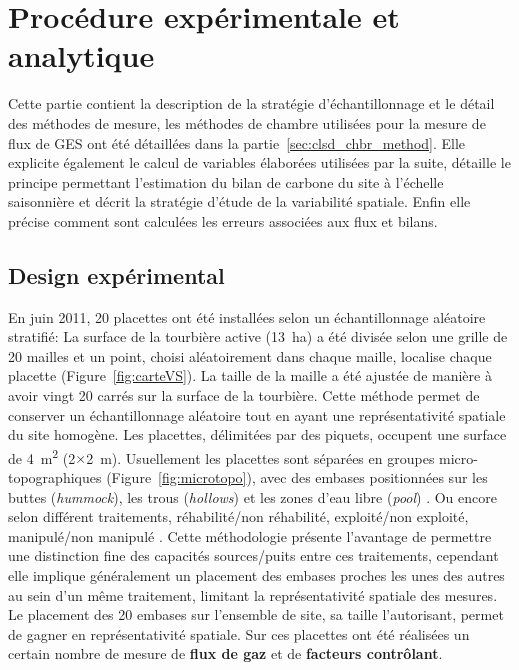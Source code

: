 \section{Procédure expérimentale et analytique}

Cette partie contient la description de la stratégie d'échantillonnage et le détail des méthodes de mesure, les méthodes de chambre utilisées pour la mesure de flux de GES ont été détaillées dans la partie~\ref{sec:clsd_chbr_method}.
Elle explicite également le calcul de variables élaborées utilisées par la suite, détaille le principe permettant l'estimation du bilan de carbone du site à l'échelle saisonnière et décrit la stratégie d'étude de la variabilité spatiale.
Enfin elle précise comment sont calculées les erreurs associées aux flux et bilans.

\subsection{Design expérimental}

En juin 2011, 20 placettes ont été installées selon un échantillonnage aléatoire stratifié:
La surface de la tourbière active (\SI{13}{\hectare}) a été divisée selon une grille de 20 mailles et un point, choisi aléatoirement dans chaque maille, localise chaque placette (Figure~\ref{fig:carteVS}).
La taille de la maille a été ajustée de manière à avoir vingt 20 carrés sur la surface de la tourbière.
Cette méthode permet de conserver un échantillonnage aléatoire tout en ayant une représentativité spatiale du site homogène. 
Les placettes, délimitées par des piquets, occupent une surface de \SI{4}{\square\metre} (2$\times$\SI{2}{\metre}).
Usuellement les placettes sont séparées en groupes micro-topographiques (Figure~\ref{fig:microtopo}), avec des embases positionnées sur les buttes (\textit{hummock}), les trous (\textit{hollows}) et les zones d'eau libre (\textit{pool}) \citep{Alm1997,waddington2000}.
Ou encore selon différent traitements, réhabilité/non réhabilité, exploité/non exploité, manipulé/non manipulé \citep{bortoluzzi2006a,strack2013}.
Cette méthodologie présente l'avantage de permettre une distinction fine des capacités sources/puits entre ces traitements, cependant elle implique généralement un placement des embases proches les unes des autres au sein d'un même traitement, limitant la représentativité spatiale des mesures.
Le placement des 20 embases sur l'ensemble de site, sa taille l'autorisant, permet de gagner en représentativité spatiale.
Sur ces placettes ont été réalisées un certain nombre de mesure de \textbf{flux de gaz} et de \textbf{facteurs contrôlant}.

